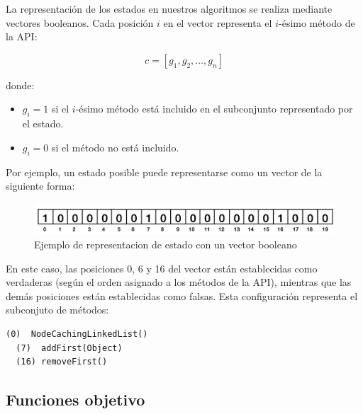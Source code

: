 
La representación de los estados en nuestros algoritmos se realiza mediante vectores booleanos. Cada posición $i$ en el vector representa el $i$-ésimo método de la API:

\[
c = [g_1, g_2, \ldots, g_n]
\]

donde:
\begin{itemize}
    \item $g_i = 1$ si el $i$-ésimo método está incluido en el subconjunto representado por el estado.
    \item $g_i = 0$ si el método no está incluido.
\end{itemize}

Por ejemplo, un estado posible puede representarse como un vector de la siguiente forma:


\begin{figure}[H]
  \centering
  \includegraphics[width=1.0\textwidth]{images/cromosoma.png}
  \caption{Ejemplo de representacion de estado con un vector booleano}
  \label{fig:cromosoma}
\end{figure}

En este caso, las posiciones 0, 6 y 16 del vector están establecidas como verdaderas (según el orden asignado a los métodos de la API), mientras que las demás posiciones están establecidas como falsas. Esta configuración representa el subconjuto de métodos:
\newline

\begin{lstlisting}[numbers=none,label=fig:NCLnoMin1, caption=Métodos generadores de objetos que representa el cromosoma de la Figura 2, captionpos=b, frame=tb , xleftmargin=0pt, basicstyle=\scriptsize]
  (0)  NodeCachingLinkedList()
  (7)  addFirst(Object)
  (16) removeFirst()
\end{lstlisting}

\subsection{Funciones objetivo}
\label{sec:fitness}

